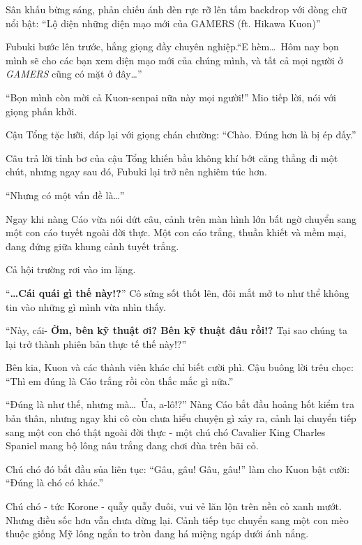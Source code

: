 \documentclass[../main.tex]{subfiles}
\begin{document}
Sân khấu bừng sáng, phản chiếu ánh đèn rực rỡ lên tấm backdrop với dòng chữ nổi bật: ``Lộ diện những diện mạo mới của GAMERS (ft. Hikawa Kuon)''

Fubuki bước lên trước, hắng giọng đầy chuyên nghiệp.``E hèm\dots\ Hôm nay bọn mình sẽ cho các bạn xem diện mạo mới của chúng mình, và tất cả mọi người ở \textit{GAMERS} cũng có mặt ở đây\dots''

``Bọn mình còn mời cả Kuon-senpai nữa này mọi người!'' Mio tiếp lời, nói với giọng phấn khởi.

Cậu Tổng tặc lưỡi, đáp lại với giọng chán chường: ``Chào. Đúng hơn là bị ép đấy.''

Câu trả lời tỉnh bơ của cậu Tổng khiến bầu không khí bớt căng thẳng đi một chút, nhưng ngay sau đó, Fubuki lại trở nên nghiêm túc hơn.

``Nhưng có một vấn đề là\dots''

Ngay khi nàng Cáo vừa nói dứt câu, cảnh trên màn hình lớn bất ngờ chuyển sang một con cáo tuyết ngoài đời thực. Một con cáo trắng, thuần khiết và mềm mại, đang đứng giữa khung cảnh tuyết trắng.


Cả hội trường rơi vào im lặng.

``\textbf{\dots Cái quái gì thế này!?}'' Cô sửng sốt thốt lên, đôi mắt mở to như thể không tin vào những gì mình vừa nhìn thấy.

``Này, cái- \textbf{Ờm, bên kỹ thuật ơi? Bên kỹ thuật đâu rồi!?} Tại sao chúng ta lại trở thành phiên bản thực tế thế này!?''

Bên kia, Kuon và các thành viên khác chỉ biết cười phì. Cậu buông lời trêu chọc: ``Thì em đúng là Cáo trắng rồi còn thắc mắc gì nữa.''

``Đúng là như thế, nhưng mà\dots\ Ủa, a-lô!?'' Nàng Cáo bắt đầu hoảng hốt kiểm tra bản thân, nhưng ngay khi cô còn chưa hiểu chuyện gì xảy ra, cảnh lại chuyển tiếp sang một con chó thật ngoài đời thực - một chú chó Cavalier King Charles Spaniel mang bộ lông nâu trắng đang chơi đùa trên bãi cỏ.


Chú chó đó bắt đầu sủa liên tục: ``Gâu, gâu! Gâu, gâu!'' làm cho Kuon bật cười: ``Đúng là chó có khác.''

Chú chó - tức Korone - quẫy quẫy đuôi, vui vẻ lăn lộn trên nền cỏ xanh mướt. Nhưng điều sốc hơn vẫn chưa dừng lại. Cảnh tiếp tục chuyển sang một con mèo thuộc giống Mỹ lông ngắn to tròn đang há miệng ngáp dưới ánh nắng.

\end{document}

